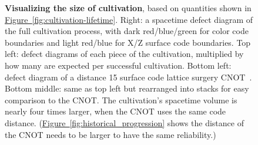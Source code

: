 \documentclass[onecolumn,unpublished,a4paper]{quantumarticle}
\theoremstyle{definition}
\newcommand{\fig}[1]{\hyperref[fig:#1]{Figure~\ref*{fig:#1}}}
\begin{document}
\begin{figure}
        \centering
    \caption{
        \textbf{Visualizing the size of cultivation}, based on quantities shown in \fig{cultivation-lifetime}.
        Right: a spacetime defect diagram of the full cultivation process, with dark red/blue/green for color code boundaries and light red/blue for X/Z surface code boundaries.
        Top left: defect diagrams of each piece of the cultivation, multiplied by how many are expected per successful cultivation.
        Bottom left: defect diagram of a distance 15 surface code lattice surgery CNOT~\cite{horsman2012latticesurgery}.
        Bottom middle: same as top left but rearranged into stacks for easy comparison to the CNOT.
        The cultivation's spacetime volume is nearly four times larger, when the CNOT uses the same code distance.
        (\fig{historical_progression} shows the distance of the CNOT needs to be larger to have the same reliability.)
    }
    \label{fig:cultivation-layout}
\end{figure}
\end{document}
